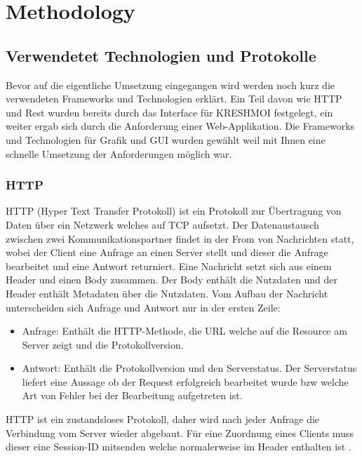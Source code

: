 
\section{Methodology}
\label{sec:methodology}

\subsection{Verwendetet Technologien und Protokolle}
\label{sec:Verwendetet Technologien}
Bevor auf die eigentliche Umsetzung eingegangen wird werden noch kurz die verwendeten Frameworks und Technologien erklärt.
Ein Teil davon wie HTTP und Rest wurden bereits durch das Interface für KRESHMOI festgelegt, ein weiter ergab sich durch die Anforderung einer Web-Applikation.
Die Frameworks und Technologien für Grafik und GUI wurden gewählt weil mit Ihnen eine schnelle Umsetzung der Anforderungen möglich war.

\subsubsection{HTTP}
\label{sec:HTTP}
HTTP (Hyper Text Transfer Protokoll) ist ein Protokoll zur Übertragung von Daten über ein Netzwerk welches auf TCP aufsetzt.
Der Datenaustausch zwischen zwei Kommunikationspartner findet in der From von Nachrichten statt, 
wobei der Client eine Anfrage an einen Server stellt und dieser die Anfrage bearbeitet und eine Antwort returniert.
%
Eine Nachricht setzt sich aus einem Header und einen Body zusammen.
Der Body enthält die Nutzdaten und der Header enthält Metadaten über die Nutzdaten.
Vom Aufbau der Nachricht unterscheiden sich Anfrage und Antwort nur in der ersten Zeile:
\begin{itemize}
	\item Anfrage: Enthält die HTTP-Methode, die URL welche auf die Resource am Server zeigt und die Protokollversion.
	\item Antwort: Enthält die Protokollversion und den Serverstatus. 
		Der Serverstatus liefert eine Aussage ob der Request erfolgreich bearbeitet wurde bzw welche Art von Fehler bei der Bearbeitung aufgetreten ist.
\end{itemize}
HTTP ist ein zustandsloses Protokoll, daher wird nach jeder Anfrage die Verbindung vom Server wieder abgebaut.
Für eine Zuordnung eines Clients muss dieser eine Session-ID mitsenden welche normalerweise im Header enthalten ist \cite{http}.

